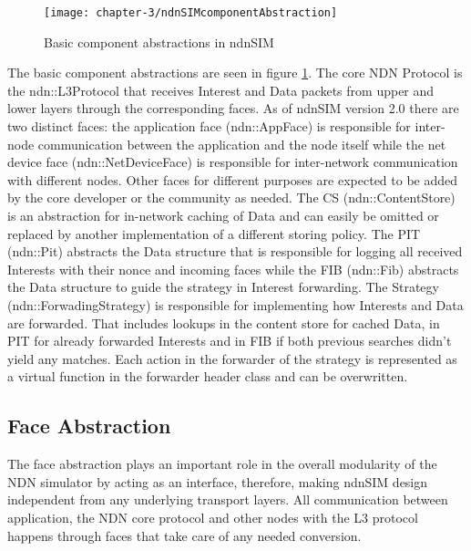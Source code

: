 \vspace{5mm} %

\begin{figure}[H]
  \centering
  \texttt{[image: chapter-3/ndnSIMcomponentAbstraction]}
  \caption{Basic component abstractions in ndnSIM \cite{afanasyev12}}
  \label{fig:ndnSIMcomponentAbstraction}
\end{figure}

\vspace{5mm} %

The basic component abstractions are seen in figure \ref{fig:ndnSIMcomponentAbstraction}. The core NDN Protocol is the ndn::L3Protocol that receives Interest and Data packets from upper and lower layers through the corresponding faces. As of ndnSIM version 2.0 there are two distinct faces: the application face (ndn::AppFace) is responsible for inter-node communication between the application and the node itself while the net device face (ndn::NetDeviceFace) is responsible for inter-network communication with different nodes. Other faces for different purposes are expected to be added by the core developer or the community as needed. The CS (ndn::ContentStore) is an abstraction for in-network caching of Data and can easily be omitted or replaced by another implementation of a different storing policy. The PIT (ndn::Pit) abstracts the Data structure that is responsible for logging all received Interests with their nonce and incoming faces while the FIB (ndn::Fib) abstracts the Data structure to guide the strategy in Interest forwarding. The Strategy (ndn::ForwadingStrategy) is responsible for implementing how Interests and Data are forwarded. That includes lookups in the content store for cached Data, in PIT for already forwarded Interests and in FIB if both previous searches didn't yield any matches. Each action in the forwarder of the strategy is represented as a virtual function in the forwarder header class and can be overwritten.

\subsection{Face Abstraction}

The face abstraction plays an important role in the overall modularity of the NDN simulator by acting as an interface, therefore, making ndnSIM design independent from any underlying transport layers. All communication between application, the NDN core protocol and other nodes with the L3 protocol happens through faces that take care of any needed conversion.

